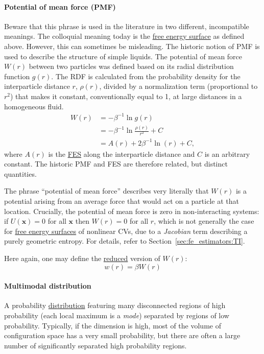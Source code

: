 \documentclass[9pt,review]{livecoms}
\newcommand{\vx}{\mathbf{x}}
\begin{document}
\hypertarget{ref:PMF} {\paragraph{Potential of mean force (PMF)}}
Beware that this phrase is used in the literature in two different, incompatible meanings. The colloquial meaning today is the \hyperlink{ref:FES} {free energy surface} as defined above.  However, this can sometimes be misleading. The historic notion of PMF is used to describe the structure of simple liquids.
The potential of mean force $W(r)$ between two particles was defined based on its radial distribution function $g(r)$. The RDF is calculated from the probability density for the interparticle distance $r$, $\rho(r)$, divided by a normalization term (proportional to $r^2$) that makes it constant, conventionally equal to 1, at large distances in a homogeneous fluid.
\begin{align}
    W(r) &= -\beta^{-1} \ln g(r) \nonumber \\
    &= -\beta^{-1} \ln \frac{\rho(r)}{r^2} + C  \nonumber \\
    &= A(r) + 2 \beta^{-1} \ln(r) + C,
    \label{eq:pmf_fes}
\end{align}
where $A(r)$ is the \hyperlink{ref:FES} {FES} along the interparticle distance and $C$ is an arbitrary constant.
The historic PMF and FES are therefore related, but distinct quantities.

The phrase ``potential of mean force'' describes very literally that $W(r)$ is a potential arising from an average force that would act on a particle at that location. Crucially, the potential of mean force is zero in non-interacting systems: if $U(\vx) = 0$ for all $\vx$ then $W(r) = 0$ for all $r$, which is not generally the case for \hyperlink{ref:FES} {free energy surfaces} of nonlinear CVs, due to a \textit{Jacobian} term describing a purely geometric entropy.
For details, refer to Section~\ref{sec:fe_estimators:TI}.

Here again, one may define the \hyperlink{ref:reduced} {reduced} version of $W(r)$:
\begin{equation}
    w(r) = \beta W(r)
\end{equation}

\hypertarget{ref:multimodal} {\paragraph{Multimodal distribution}}

A probability \hyperlink{ref:Distribution} {distribution} featuring many disconnected regions of high probability (each local maximum is a \textit{mode}) separated by regions of low probability. Typically, if the dimension is high, most of the volume of configuration space has a very small probability, but there are often  a large number of significantly separated high probability regions.
\end{document}
